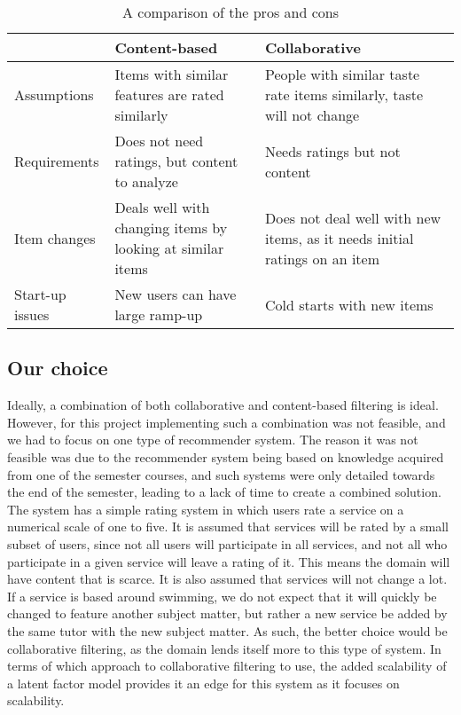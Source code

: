 \begin{table}[]
    \begin{tabular}{|p{}|p{}|p{}|}
    \hline
                    & Content-based                                              & Collaborative                                                             \\ \hline
    Assumptions     & Items with similar features are rated similarly            & People with similar taste rate items similarly, taste will not change     \\ \hline
    Requirements    & Does not need ratings, but content to analyze              & Needs ratings but not content                                             \\ \hline
    Item changes    & Deals well with changing items by looking at similar items & Does not deal well with new items, as it needs initial ratings on an item \\ \hline
    Start-up issues & New users can have large ramp-up                           & Cold starts with new items                                                \\ \hline
    \end{tabular}
    \caption{A comparison of the pros and cons}
    \label{tab:recprosandcons}
    \end{table}

\subsection{Our choice}
Ideally, a combination of both collaborative and content-based filtering is ideal.
However, for this project implementing such a combination was not feasible, and we had to focus on one type of recommender system.
The reason it was not feasible was due to the recommender system being based on knowledge acquired from one of the semester courses, and such systems were only detailed towards the end of the semester, leading to a lack of time to create a combined solution.
The system has a simple rating system in which users rate a service on a numerical scale of one to five.
It is assumed that services will be rated by a small subset of users, since not all users will participate in all services, and not all who participate in a given service will leave a rating of it.
This means the domain will have content that is scarce.
It is also assumed that services will not change a lot.
If a service is based around swimming, we do not expect that it will quickly be changed to feature another subject matter, but rather a new service be added by the same tutor with the new subject matter.
As such, the better choice would be collaborative filtering, as the domain lends itself more to this type of system.
In terms of which approach to collaborative filtering to use, the added scalability of a latent factor model provides it an edge for this system as it focuses on scalability.

